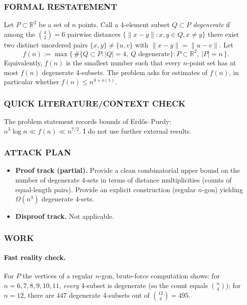 \subsubsection*{FORMAL RESTATEMENT}
Let \(P\subset\mathbb{R}^2\) be a set of \(n\) points.
Call a 4-element subset \(Q\subset P\) \emph{degenerate} if among the \(\binom{4}{2}=6\) pairwise distances \(\{\|x-y\|: x,y\in Q, x\ne y\}\) there exist two distinct unordered pairs \(\{x,y\}\ne\{u,v\}\) with \(\|x-y\|=\|u-v\|\).
Let
\[
 f(n):=\max\{\,\#\{Q\subset P: |Q|=4,\ Q\text{ degenerate}\}: P\subset\mathbb{R}^2,\ |P|=n\,\}.
\]
Equivalently, \(f(n)\) is the smallest number such that every \(n\)-point set has at most \(f(n)\) degenerate 4-subsets.
The problem asks for estimates of \(f(n)\), in particular whether \(f(n)\le n^{3+o(1)}\).

\subsubsection*{QUICK LITERATURE/CONTEXT CHECK}
The problem statement records bounds of Erd\H{o}s--Purdy:
\(n^3\log n \ll f(n) \ll n^{7/2}\).
I do not use further external results.

\subsubsection*{ATTACK PLAN}
\begin{itemize}
\item \textbf{Proof track (partial).} Provide a clean combinatorial upper bound on the number of degenerate 4-sets in terms of distance multiplicities (counts of equal-length pairs). Provide an explicit construction (regular \(n\)-gon) yielding \(\Omega(n^3)\) degenerate 4-sets.
\item \textbf{Disproof track.} Not applicable.
\end{itemize}

\subsubsection*{WORK}

\paragraph{Fast reality check.} For \(P\) the vertices of a regular \(n\)-gon, brute-force computation shows:
for \(n=6,7,8,9,10,11\), \emph{every} 4-subset is degenerate (so the count equals \(\binom{n}{4}\)); for \(n=12\), there are \(447\) degenerate 4-subsets out of \(\binom{12}{4}=495\).

